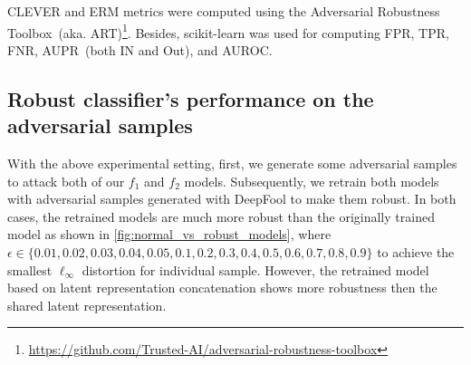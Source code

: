 \hspace*{3.5mm} CLEVER and ERM metrics were computed using the Adversarial Robustness Toolbox~(aka. ART)\footnote{\url{https://github.com/Trusted-AI/adversarial-robustness-toolbox}}. Besides, scikit-learn was used for computing FPR, TPR, FNR, AUPR~(both IN and Out), and AUROC. 

\subsection{Robust classifier's performance on the adversarial samples}
With the above experimental setting, first, we generate some adversarial samples to attack both of our $f_1$ and $f_2$ models. Subsequently, we retrain both models with adversarial samples generated with DeepFool to make them robust. In both cases, the retrained models are much more robust than the originally trained model as shown in \cref{fig:normal_vs_robust_models}, where $\epsilon \in\{0.01, 0.02, 0.03, 0.04, 0.05, 0.1, 0.2, 0.3, 0.4, 0.5, 0.6, 0.7, 0.8, 0.9\}$ to achieve the smallest $\ell_{\infty}$ distortion for individual sample. However, the retrained model based on latent representation concatenation shows more robustness then the shared latent representation. 
